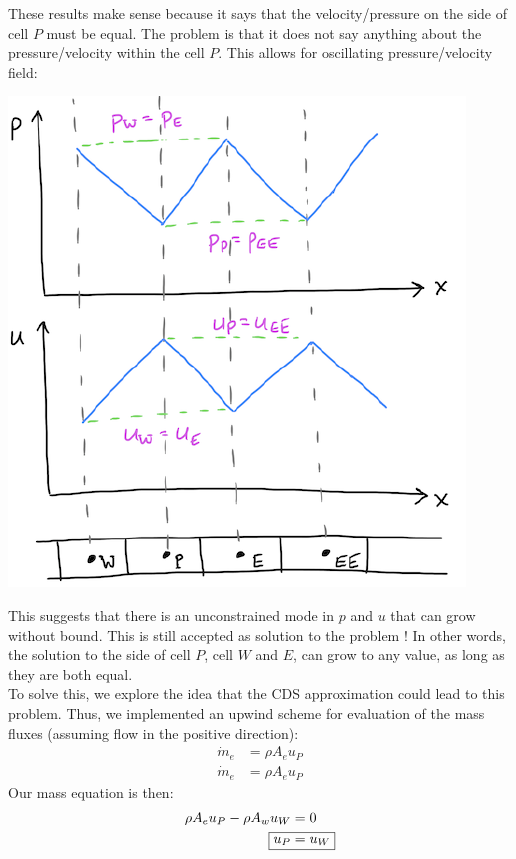 \documentclass[11pt]{article}
\begin{document}
These results make sense because it says that the velocity/pressure on the side of cell \(P\) must be equal. The problem is that it does not
say anything about the pressure/velocity within the cell \(P\).  This allows for oscillating pressure/velocity field:
\begin{center}
\includegraphics[scale=0.8]{../pic/cellP_Oscillating.png}
\end{center}
This suggests that there is an unconstrained mode in \(p\) and \(u\) that can grow without bound. This is still accepted
as solution to the problem ! In other words, the solution to the side of cell \(P\), cell \(W\) and \(E\), can grow to
any value, as long as they are both equal.\\
To solve this, we explore the idea that the CDS approximation could lead to this problem. Thus, we implemented
an upwind scheme for evaluation of the mass fluxes (assuming flow in the positive direction):
\begin{equation*}
\begin{aligned}
\dot{m}_e &= \rho A_e u_P\\
\dot{m}_e &= \rho A_e u_P
\end{aligned}
\end{equation*}
Our mass equation is then:
\begin{equation*}
\begin{aligned}
\rho A_e u_P - \rho A_w u_W &= 0\\
\Aboxed{u_P &= u_W}
\end{aligned}
\end{equation*}
\end{document}
